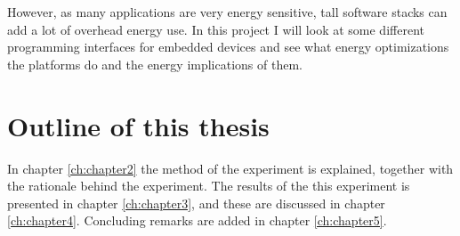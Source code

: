 However, as many applications are very energy sensitive, tall software stacks can add a lot of overhead energy use. 
In this project I will look at some different programming interfaces for embedded devices and see what energy optimizations the platforms do and the energy implications of them.

\section{Outline of this thesis}
In chapter \ref{ch:chapter2} the method of the experiment is explained, together with the rationale behind the experiment.
The results of the this experiment is presented in chapter \ref{ch:chapter3}, and these are discussed in chapter \ref{ch:chapter4}.
Concluding remarks are added in chapter \ref{ch:chapter5}.